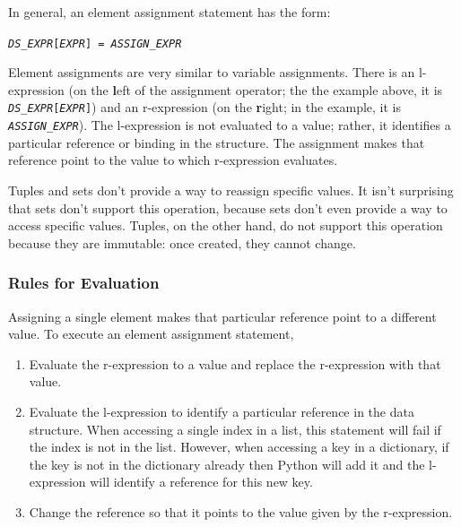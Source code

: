 \documentclass{article}
\newcommand{\expr}[1]{\texttt{#1}}
\newcommand{\mvar}[1]{\expr{\emph{\uppercase{#1}}}}
\begin{document}
  In general, an element assignment statement has the form:


  \begin{description}
    \item \expr{\mvar{DS\_EXPR}[\mvar{EXPR}] = \mvar{ASSIGN\_EXPR}}
  \end{description}

Element assignments are very similar to variable assignments.  There is an
l-expression (on the \textbf{l}eft of the assignment operator; the the
example above, it is \expr{\mvar{DS\_EXPR}[\mvar{EXPR}]}) and an r-expression
(on the \textbf{r}ight; in the example, it is \expr{\mvar{ASSIGN\_EXPR}}).
The l-expression is not evaluated to a value; rather, it
identifies a particular reference or binding in the structure.   The
assignment makes that reference point to the value to which r-expression
evaluates.

Tuples and sets don't provide a way to reassign specific values.  It isn't
surprising that sets don't support this operation, because sets don't even
provide a way to access specific values.  Tuples, on the other hand, do not
support this operation because they are immutable: once created, they cannot
change.

\subsubsection{Rules for Evaluation}

  Assigning a single element makes that particular reference point to a different value. To execute an element assignment statement,

  \begin{enumerate}
    \item
    Evaluate the r-expression to a value and replace the r-expression with that value.

  \item
    Evaluate the l-expression to identify a particular reference in the
    data structure.  When accessing a single index in a list, this
    statement will fail if the index is not in the list.  However, when
    accessing a key in a dictionary, if the key is not in the dictionary
    already then Python will add it and the l-expression will identify a
    reference for this new key.

    \item
    Change the reference so that it points to the value given by the r-expression.
  \end{enumerate}
\end{document}
